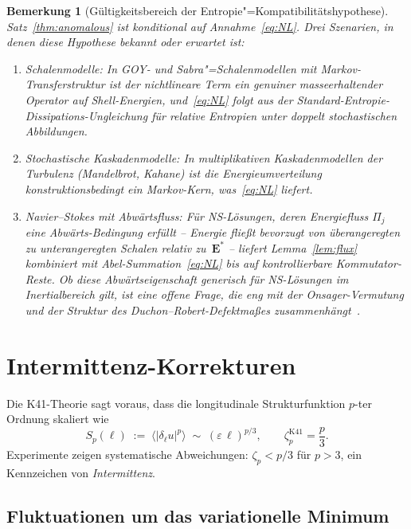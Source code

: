 \documentclass[12pt,a4paper]{article}
\theoremstyle{breakdef}
\theoremstyle{breakplain}
\theoremstyle{breakdef}
\newtheorem{remark}[definition]{Bemerkung}
\begin{document}
\begin{remark}[Gültigkeitsbereich der Entropie"=Kompatibilitätshypothese]
Satz~\ref{thm:anomalous} ist konditional auf
Annahme~\eqref{eq:NL}. Drei Szenarien, in denen diese Hypothese
bekannt oder erwartet ist:
\begin{enumerate}
\item \emph{Schalenmodelle:} In GOY- und Sabra"=Schalenmodellen mit
  Markov-Transferstruktur ist der nichtlineare Term ein genuiner
  masseerhaltender Operator auf Shell-Energien, und~\eqref{eq:NL}
  folgt aus der Standard-Entropie-Dissipations-Ungleichung für relative
  Entropien unter doppelt stochastischen Abbildungen.
\item \emph{Stochastische Kaskadenmodelle:} In multiplikativen
  Kaskadenmodellen der Turbulenz (Mandelbrot, Kahane) ist die
  Energieumverteilung konstruktionsbedingt ein Markov-Kern, was~\eqref{eq:NL}
  liefert.
\item \emph{Navier--Stokes mit Abwärtsfluss:} Für NS-Lösungen, deren
  Energiefluss $\Pi_j$ eine \glqq Abwärts\grqq{}-Bedingung erfüllt -- Energie
  fließt bevorzugt von überangeregten zu unterangeregten Schalen relativ
  zu~$\mathbf{E}^*$ -- liefert Lemma~\ref{lem:flux} kombiniert mit
  Abel-Summation~\eqref{eq:NL} bis auf kontrollierbare Kommutator-Reste.
  Ob diese Abwärtseigenschaft generisch für NS-Lösungen im
  Inertialbereich gilt, ist eine offene Frage, die eng mit der
  Onsager-Vermutung und der Struktur des Duchon--Robert-Defektmaßes
  zusammenhängt~\cite{DR00}.
\end{enumerate}
\end{remark}

\section{Intermittenz-Korrekturen}\label{sec:intermittency}

Die K41-Theorie sagt voraus, dass die longitudinale Strukturfunktion
$p$-ter Ordnung skaliert wie
\begin{equation}\label{eq:Sp_K41}
  S_p(\ell) \;:=\;
  \bigl\langle |\delta_\ell u|^p \bigr\rangle
  \;\sim\; (\varepsilon\,\ell)^{p/3},
  \qquad
  \zeta_p^{\mathrm{K41}} = \frac{p}{3}.
\end{equation}
Experimente zeigen systematische Abweichungen: $\zeta_p < p/3$ für
$p > 3$, ein Kennzeichen von \emph{Intermittenz}.

\subsection{Fluktuationen um das variationelle Minimum}
\end{document}
